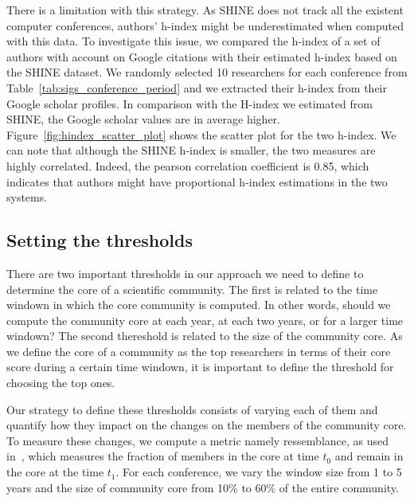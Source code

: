 There is a limitation with this strategy.  As SHINE does not track all the existent computer conferences, authors' h-index might be underestimated when computed with this data. To
investigate this issue, we compared the h-index of a set of authors with account on Google citations with their estimated h-index based on the SHINE dataset.  We randomly selected
10 researchers for each conference from Table~\ref{tab:sigs_conference_period} and we extracted their h-index from their Google scholar profiles.  In comparison with the H-index we
estimated from SHINE, the Google scholar values are in average  higher. Figure~\ref{fig:hindex_scatter_plot} shows the scatter plot for the two h-index. We can note that
although the SHINE h-index is smaller, the two measures are highly correlated. Indeed, the pearson correlation coefficient is 0.85, which indicates that authors might have
proportional h-index estimations in the two systems. 



\subsection{Setting the thresholds}
\label{sub:thresholds}


There are two important thresholds in our approach we need to define to determine the core of a scientific community.  The first is related to the time windown in which the core
community is computed. In other words, should we compute the community core at each year, at each two years, or for a larger time windown? The second thereshold is related to the
size of the community core. As we define the core of a community as the top researchers in terms of their core score during a certain time windown, it is important to define the
threshold for choosing the top ones. 

Our strategy to define these thresholds consists of varying each of them and quantify how they impact on the changes on the members of the community core. To measure these changes,
we compute a metric namely ressemblance, as used in~\cite{Viswanath:2009}, which measures the fraction of members in the core at time $t_0$ and remain in the core at the time
$t_1$. For each conference, we vary the window size from 1 to 5 years and the size of community core from 10\% to 60\% of the entire community. 


